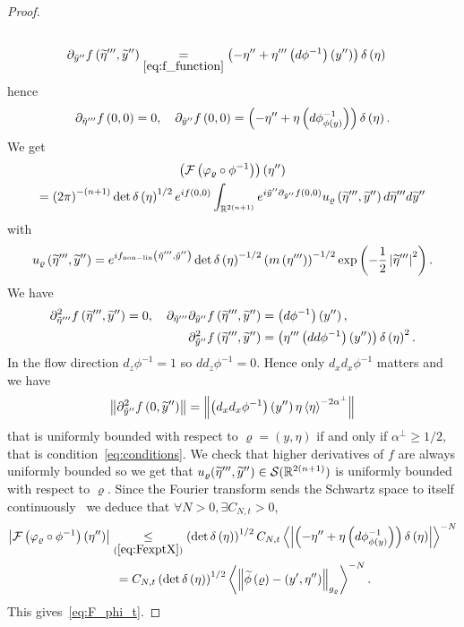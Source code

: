 \documentclass[AHL,Unicode,longabstracts,published]{cedram}
\newcommand*\ineq[1]{\underset{(#1)}{\leq}}
\newcommand{\clS}{\mathcal{S}}
\newcommand{\clF}{\mathcal{F}}
\newcommand{\nonlin}{\mathrm{non-lin}}
\newcommand{\bbR}{\mathbb{R}}
\let\oldtilde\tilde
\renewcommand*{\tilde}[1]{\mathchoice{\widetilde{#1}}{\widetilde{#1}}{\oldtilde{#1}}{\oldtilde{#1}}}
\let\oldexists\exists
\renewcommand*{\exists}{\mathrel{\oldexists}}
\let\oldforall\forall
\renewcommand*{\forall}{\mathrel{\oldforall}}
\newcommand{\bbR}{\mathbb{R}}
\begin{document}
\begin{proof}
\begin{align*}
\\
\partial_{\tilde{y}''}f\left(\tilde{\eta}''',\tilde{y}''\right) &\underset{\eqref{eq:f_function}}{=}\left(-\eta''+\eta'''\left(d\phi^{-1}\right)\left(y''\right)\right)\delta\left(\eta\right)
\end{align*}
hence
\[
\partial_{\tilde{\eta}'''}f\left(0,0\right)=0,\quad\partial_{\tilde{y}''}f\left(0,0\right)=\left(-\eta''+\eta\left(d\phi_{\phi\left(y\right)}^{-1}\right)\right)\delta\left(\eta\right).
\]
We get
\begin{multline}\label{eq:FexptX}
\left(\clF\left(\varphi_{\varrho}\circ\phi^{-1}\right)\right)\left(\eta''\right)\\
=\left(2\pi\right)^{-\left(n+1\right)}\det \delta\left(\eta\right)^{1/2}e^{if\left(0,0\right)}\int_{\bbR^{2\left(n+1\right)}}e^{i\tilde{y}''\partial_{\tilde{y}''}f\left(0,0\right)}u_{\varrho}\left(\tilde{\eta}''',\tilde{y}''\right)d\tilde{\eta}'''d\tilde{y}''
\end{multline}
with
\[
u_{\varrho}\left(\tilde{\eta}''',\tilde{y}''\right)=e^{if_{\nonlin}\left(\tilde{\eta}''',\tilde{y}''\right)}\det \delta\left(\eta\right)^{-1/2}\left(m\left(\eta'''\right)\right)^{-1/2}\exp\left(-\frac{1}{2}\left|\tilde{\eta}'''\right|^{2}\right).
\]
We have
\begin{align*}
\partial_{\tilde{\eta}'''}^{2}f\left(\tilde{\eta}''',\tilde{y}''\right)=0,\quad\partial_{\tilde{\eta}'''}\partial_{\tilde{y}''}f\left(\tilde{\eta}''',\tilde{y}''\right) &=\left(d\phi^{-1}\right)\left(y''\right),\\
\partial_{\tilde{y}''}^{2}f\left(\tilde{\eta}''',\tilde{y}''\right) &=\left(\eta'''\left(dd\phi^{-1}\right)\left(y''\right)\right)\delta\left(\eta\right)^{2}.
\end{align*}
In the flow direction $d_{z}\phi^{-1}=1$ so $dd_{z}\phi^{-1}=0$. Hence only $d_{x}d_{x}\phi^{-1}$ matters and we have
\[
\left\Vert \partial_{\tilde{y}''}^{2}f\left(0,\tilde{y}''\right)\right\Vert =\left\Vert \left(d_{x}d_{x}\phi^{-1}\right)\left(y''\right)\eta\left\langle \eta\right\rangle ^{-2\alpha^{\perp}}\right\Vert
\]
that is uniformly bounded with respect to $\varrho=(y,\eta)$ if and only if $\alpha^{\perp}\geq1/2$, that is condition~\eqref{eq:conditions}. We check that higher derivatives of $f$ are always uniformly bounded so we get that $u_{\varrho}(\tilde{\eta}''',\tilde{y}'')\in\clS(\bbR^{2(n+1)})$ is uniformly bounded with respect to $\varrho$. Since the Fourier transform sends the Schwartz space to itself continuously~\cite[p.~222]{taylor_tome1} we deduce that $\forall N>0,\exists C_{N,t}>0$,
\begin{align*}
\left|\clF\left(\varphi_{\varrho}\circ\phi^{-1}\right)\left(\eta''\right)\right| & \ineq{\ref{eq:FexptX}}\left(\det \delta\left(\eta\right)\right)^{1/2}C_{N,t}\left\langle \left|\left(-\eta''+\eta\left(d\phi_{\phi\left(y\right)}^{-1}\right)\right)\delta\left(\eta\right)\right|\right\rangle ^{-N}\\
&\mkern8mu =C_{N,t}\left(\det \delta\left(\eta\right)\right)^{1/2}\left\langle \left\Vert \tilde{\phi}\left(\varrho\right)-\left(y',\eta''\right)\right\Vert _{g_{\varrho}}\right\rangle ^{-N}.
\end{align*}
This gives~\eqref{eq:F_phi_t}.
\end{proof}
\end{document}
